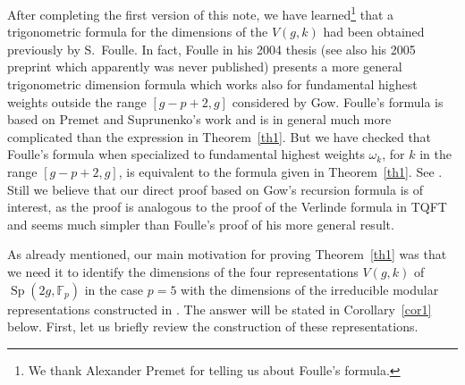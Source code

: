 \documentclass{amsart}
\begin{document}
\vskip 8pt
 After completing the first version of this
note, we have learned\footnote{We thank Alexander Premet for telling
  us about Foulle's formula.} that a trigonometric formula for the dimensions of the $V(g,k)$ had been
obtained previously by S.~Foulle.  In fact, 
Foulle in his 2004 thesis \cite{F1} 
(see also his 2005 preprint \cite{F2} which apparently was never published) 
presents 
a more general 
trigonometric dimension formula which works also for fundamental highest
weights 
outside the range $[g-p+2,g]$
considered by Gow.
Foulle's formula is based on Premet and Suprunenko's work
\cite{PS} and is in general much more complicated than the expression in
Theorem~\ref{th1}. But we have checked that Foulle's formula 
when specialized to fundamental highest weights
$\omega_k$, for $k$ 
in the range $[g-p+2,g]$, 
 is equivalent to the formula given in
Theorem~\ref{th1}.   
See \cite[Example~4.6]{F2}.  
Still we believe that our direct proof based on Gow's
recursion formula is of interest, as the proof is analogous
to the proof of the 
Verlinde formula in TQFT and seems much simpler than
Foulle's proof of his more general result.
\vskip 8pt

As already mentioned, our main motivation for proving
Theorem~\ref{th1} was that we need it   
to identify the dimensions of the four
representations 
$V(g,k)$ 
of $\operatorname{Sp}(2g,{{\mathbb{F}}}_p)$ 
in
the case $p=5$  
with the dimensions of 
 the 
irreducible modular
representations constructed in \cite{GM4}.   
The answer will be stated
 in Corollary~\ref{cor1} 
 below. 
First, let 
us
briefly review the construction of these representations.
\end{document}
